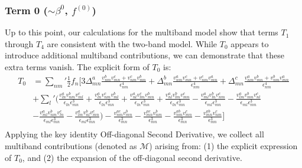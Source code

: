 \documentclass[twocolumn, prx, reprint, amsfonts, amsmath, amssymb, longbibliography, floatfix, aps]{revtex4-2}
\begin{document}
\subsubsection*{Term 0 (\texorpdfstring{$\sim \beta^0$}{beta0}, \texorpdfstring{$f^{(0)}$}{f0})}
Up to this point, our calculations for the multiband model show that terms $T_1$ through $T_4$ are consistent with the two-band model. While $T_0$ appears to introduce additional multiband contributions, we can demonstrate that these extra terms vanish. The explicit form of $T_0$ is:
\begin{equation}
	\begin{aligned}
		T_0
		&= {\textstyle \sum_{nm}'}\frac{1}{2}f_n\Big[3\Delta^a_{mn}\frac{v^{b}_{nm}v^{c}_{mn} + v^{c}_{nm}v^{b}_{mn}}{\epsilon_{nm}^4} +  \Delta^b_{mn}\frac{v^{a}_{nm}v^{c}_{mn} + v^{c}_{nm}v^{a}_{mn}}{\epsilon_{nm}^4}+ \Delta^c_{mn}\frac{v^{a}_{nm}v^{b}_{mn} + v^{b}_{nm}v^{a}_{mn}}{\epsilon_{nm}^4} \\
		&+ {\textstyle \sum_{l}'}\Big( \frac{v^a_{ln}v^b_{nm}v^c_{ml}}{\epsilon_{ln}\epsilon^3_{mn}} + \frac{v^a_{ln}v^c_{nm}v^b_{ml}}{\epsilon_{ln}\epsilon^3_{mn}} +
        \frac{v^a_{nl}v^c_{lm}v^b_{mn}}{\epsilon_{ln}\epsilon^3_{mn}} +
		\frac{v^a_{nl}v^b_{lm}v^c_{mn}}{\epsilon_{ln}\epsilon^3_{mn}}-\frac{v^a_{ml}v^b_{ln}v^c_{nm}}{\epsilon_{ml}\epsilon^3_{mn}} -\frac{v^a_{lm}v^b_{mn}v^c_{nl}}{\epsilon_{ml}\epsilon^3_{mn}}\\
		& -
		\frac{v^a_{ml}v^b_{nm}v^c_{ln}}{\epsilon_{ml}\epsilon^3_{mn}}  -
		\frac{v^a_{lm}v^b_{nl}v^c_{mn}}{\epsilon_{ml}\epsilon^3_{mn}}\Big)- \frac{v^{ac}_{nm}v^b_{mn}}{\epsilon^3_{mn}} -\frac{v^{ac}_{mn}v^b_{nm}}{\epsilon^3_{mn}} -\frac{v^{ab}_{nm}v^c_{mn}}{\epsilon^3_{mn}} -  \frac{v^{ab}_{mn}v^c_{nm}}{\epsilon^3_{mn}}\Big] \\ 
	\end{aligned}
\end{equation}
Applying the key identity Off-diagonal Second Derivative, we collect all multiband contributions (denoted as $\mathcal{M}$) arising from: (1) the explicit expression of $T_0$, and (2) the expansion of the off-diagonal second derivative.
\end{document}
